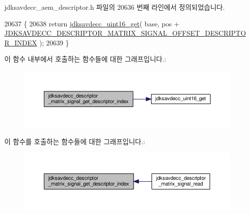 jdksavdecc\+\_\+aem\+\_\+descriptor.\+h 파일의 20636 번째 라인에서 정의되었습니다.


\begin{DoxyCode}
20637 \{
20638     \textcolor{keywordflow}{return} \hyperlink{group__endian_ga3fbbbc20be954aa61e039872965b0dc9}{jdksavdecc\_uint16\_get}( base, pos + 
      \hyperlink{group__descriptor__matrix__signal_gad878b96f01d040970dd238c7bb1ecad5}{JDKSAVDECC\_DESCRIPTOR\_MATRIX\_SIGNAL\_OFFSET\_DESCRIPTOR\_INDEX}
       );
20639 \}
\end{DoxyCode}


이 함수 내부에서 호출하는 함수들에 대한 그래프입니다.\+:
\nopagebreak
\begin{figure}[H]
\begin{center}
\leavevmode
\includegraphics[width=350pt]{group__descriptor__matrix__signal_ga71631c6c15a97fa8bbd6037574816b22_cgraph}
\end{center}
\end{figure}




이 함수를 호출하는 함수들에 대한 그래프입니다.\+:
\nopagebreak
\begin{figure}[H]
\begin{center}
\leavevmode
\includegraphics[width=350pt]{group__descriptor__matrix__signal_ga71631c6c15a97fa8bbd6037574816b22_icgraph}
\end{center}
\end{figure}


